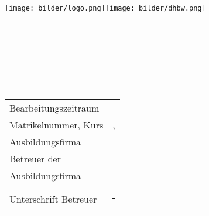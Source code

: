 \begin{titlepage}
\texttt{[image: bilder/logo.png]}\hfill\texttt{[image: bilder/dhbw.png]}
\begin{center}
    \vspace*{\baselineskip}{\LARGE \textbf \titel}\\
    \\
    \\
    \\
    \\
    \vspace*{.25\baselineskip}{\Large \textbf \autor}\\
\end{center}
\vfill
\begin{tabularx}{\textwidth}{Xl}
    Bearbeitungszeitraum & \bearbeitung{} \\
    Matrikelnummer, Kurs & \matrikelnr{}, \kurs{} \\
    Ausbildungsfirma & \firma{} \\
    Betreuer der & \betreuer{} \\
    Ausbildungsfirma &\\
    &\\
    Unterschrift Betreuer & \rule{7cm}{1pt} \\
\end{tabularx}
\end{titlepage}
